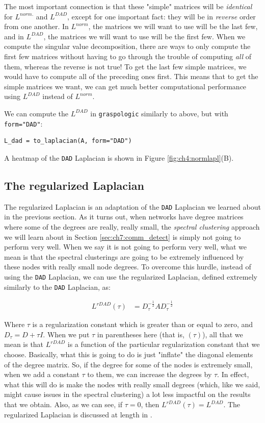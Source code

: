 The most important connection is that these "simple" matrices will be \emph{identical} for $L^{norm.}$ and $L^{DAD}$, except for one important fact: they will be in \emph{reverse} order from one another. In $L^{norm}$, the matrices we will want to use will be the last few, and in $L^{DAD}$, the matrices we will want to use will be the first few. When we compute the singular value decomposition, there are ways to only compute the first few matrices without having to go through the trouble of computing \emph{all} of them, whereas the reverse is not true! To get the last few simple matrices, we would have to compute all of the preceding ones first. This means that to get the simple matrices we want, we can get much better computational performance using $L^{DAD}$ instead of $L^{norm}$.

We can compute the $L^{DAD}$ in \texttt{graspologic} similarly to above, but with \texttt{form="DAD"}:

\begin{lstlisting}[style=python]
L_dad = to_laplacian(A, form="DAD")
\end{lstlisting}

A heatmap of the \texttt{DAD} Laplacian is shown in Figure \ref{fig:ch4:normlapl}(B).

\subsection{The regularized Laplacian}
\label{ch4:mtx-rep:reg_laplacian}
The regularized Laplacian is an adaptation of the \texttt{DAD} Laplacian we learned about in the previous section. As it turns out, when networks have degree matrices where some of the degrees are really, really small, the \emph{spectral clustering} approach we will learn about in Section \ref{sec:ch7:comm_detect} is simply not going to perform very well. When we say it is not going to perform very well, what we mean is that the spectral clusterings are going to be extremely influenced by these nodes with really small node degrees. To overcome this hurdle, instead of using the \texttt{DAD} Laplacian, we can use the regularized Laplacian, defined extremely similarly to the \texttt{DAD} Laplacian, as:

\begin{align*}
    L^{rDAD}(\tau) &= D_\tau^{-\frac{1}{2}}A D_\tau^{-\frac{1}{2}}
\end{align*}

Where $\tau$ is a regularization constant which is greater than or equal to zero, and $D_\tau = D + \tau I$. When we put $\tau$ in parentheses here (that is, $(\tau)$), all that we mean is that $L^{rDAD}$ is a function of the particular regularization constant that we choose. Basically, what this is going to do is just "inflate" the diagonal elements of the degree matrix. So, if the degree for some of the nodes is extremely small, when we add a constant $\tau$ to them, we can increase the degrees by $\tau$. In effect, what this will do is make the nodes with really small degrees (which, like we said, might cause issues in the spectral clustering) a lot less impactful on the results that we obtain. Also, as we can see, if $\tau = 0$, then $L^{rDAD}(\tau) = L^{DAD}$. The regularized Laplacian is discussed at length in \cite{Qin2013Sep}.

